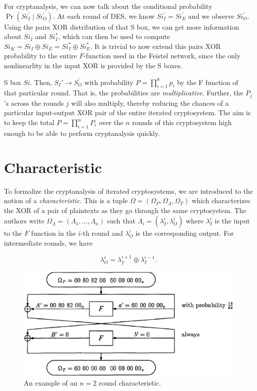 \documentclass[twoside]{article}
\begin{document}
For cryptanalysis, we can now talk about the conditional probability
\(\Pr(Si_I^\prime \mid Si_O^\prime)\). At each round of DES, we know
\(Si_I^\prime = Si_E^\prime\) and we observe \(Si_O^\prime\). Using the pairs
XOR distribution of that S box, we can get more information about \(Si_I\) and
\(Si_I^*\), which can then be used to compute \(Si_K = Si_I \oplus Si_E = Si_I^*
\oplus Si_E^*\). It is trivial to now extend this pairs XOR probability to the
entire \(F\)-function used in the Feistel network, since the only nonlinearlity
in the input XOR is provided by the S boxes.

S box \(Si\). Then, \(S_I\prime \rightarrow S_O^\prime\) with probability \(P =
\prod_{i=1}^8p_i\) by the F function of that particular round. That is, the
probabilities are \emph{multiplicative}. Further, the \(P_j\)'s across the
rounds \(j\) will also multiply, thereby reducing the chances of a particular
input-output XOR pair of the entire iterated cryptosystem. The aim is to keep
the total \(P = \prod_{i=1}^nP_i\) over the \(n\) rounds of this cryptosystem
high enough to be able to perform cryptanalysis quickly.

\section{Characteristic}

To formalize the cryptanalysis of iterated cryptosystems, we are introduced to
the notion of a \emph{characteristic}. This is a tuple \(\Omega = (\Omega_P,
\Omega_\Lambda, \Omega_T)\) which characterizes the XOR of a pair of plaintexts
as they go through the same cryptosystem. The authors write \(\Omega_\Lambda =
(\Lambda_1, \ldots, \Lambda_n)\) such that \(\Lambda_i = (\lambda_I^i,
\lambda_O^i)\) where \(\lambda_I^i\) is the input to the \(F\) function in the
\(i\)-th round and \(\lambda_O^i\) is the corresponding output. For intermediate
rounds, we have

\begin{equation}
    \lambda_O^i = \lambda_I^{i+1} \oplus \lambda_I^{i-1}.
    \label{eq:lambda-io-rel}
\end{equation}

\begin{figure}[!ht]
    \centering
    \includegraphics[width=0.5\linewidth]{images/des_char.png}
    \caption{An example of an \(n=2\) round characteristic.}
    \label{fig:des-char}
\end{figure}
\end{document}
